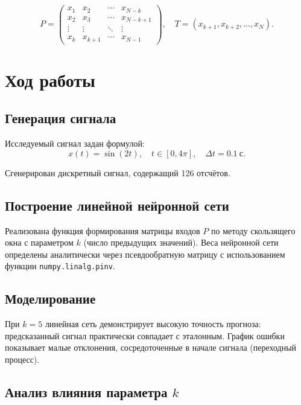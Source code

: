\documentclass[14pt,a4paper]{extarticle}
\begin{document}
\begin{equation}
P = \begin{pmatrix}
x_1 & x_2 & \cdots & x_{N-k} \\
x_2 & x_3 & \cdots & x_{N-k+1} \\
\vdots & \vdots & \ddots & \vdots \\
x_k & x_{k+1} & \cdots & x_{N-1}
\end{pmatrix}, \quad
T = (x_{k+1}, x_{k+2}, \ldots, x_N).
\end{equation}

\section{Ход работы}

\subsection{Генерация сигнала}

Исследуемый сигнал задан формулой:
\begin{equation}
x(t) = \sin(2t), \quad t \in [0, 4\pi], \quad \Delta t = 0.1~\text{с}.
\end{equation}

Сгенерирован дискретный сигнал, содержащий 126 отсчётов.

\subsection{Построение линейной нейронной сети}

Реализована функция формирования матрицы входов $P$ по методу скользящего окна с параметром $k$ (число предыдущих значений). Веса нейронной сети определены аналитически через псевдообратную матрицу с использованием функции \texttt{numpy.linalg.pinv}.

\subsection{Моделирование}

При $k = 5$ линейная сеть демонстрирует высокую точность прогноза: предсказанный сигнал практически совпадает с эталонным. График ошибки показывает малые отклонения, сосредоточенные в начале сигнала (переходный процесс).

\subsection{Анализ влияния параметра $k$}
\end{document}
